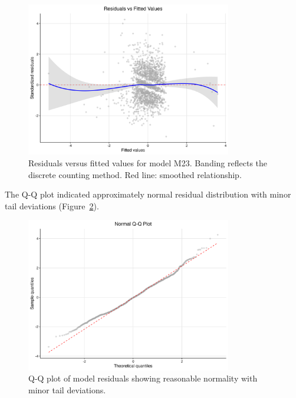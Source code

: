 \begin{figure}[htbp]
\centering
\includegraphics[width=0.8\textwidth]{supplemental/results/thesis_exports/figures/residuals_vs_fitted.png}
\caption{Residuals versus fitted values for model M23. Banding reflects the discrete counting method. Red line: smoothed relationship.}\label{fig:residuals}
\end{figure}

The Q-Q plot indicated approximately normal residual distribution with minor tail deviations (Figure~\ref{fig:qqplot}).

\begin{figure}[htbp]
\centering
\includegraphics[width=0.8\textwidth]{supplemental/results/thesis_exports/figures/qq_plot.png}
\caption{Q-Q plot of model residuals showing reasonable normality with minor tail deviations.}\label{fig:qqplot}
\end{figure}

